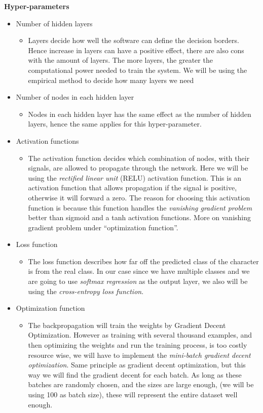 \documentclass[Report.tex]{subfiles}
\begin{document}
  \begin{flushleft}
    \textbf{Hyper-parameters}
    \begin{itemize}
     \item{Number of hidden layers}
     \begin{itemize}
      \item{Layers decide how well the software can define the decision borders. Hence increase in layers can have a positive effect, there are also cons with the amount of layers. The more layers, the greater the computational power needed to train the system. We will be using the empirical method to decide how many layers we need}
     \end{itemize}
     \item{Number of nodes in each hidden layer}
     \begin{itemize}
      \item{Nodes in each hidden layer has the same effect as the number of hidden layers, hence the same applies for this hyper-parameter.}
     \end{itemize}
     \item{Activation functions}
     \begin{itemize}
      \item{The activation function decides which combination of nodes, with their signals, are allowed to propagate through the network. Here we will be using the \textit{rectified linear unit} (RELU) activation function. This is an activation function that allows propagation if the signal is positive, otherwise it will forward a zero. The reason for choosing this activation function is because this function handles the \textit{vanishing gradient problem} better than sigmoid and a tanh activation functions. More on vanishing gradient problem under ``optimization function''.}
     \end{itemize}
     \item{Loss function}
     \begin{itemize}
      \item{The loss function describes how far off the predicted class of the character is from the real class. In our case since we have multiple classes and we are going to use \textit{softmax regression} as the output layer, we also will be using the \textit{cross-entropy loss function}.}
     \end{itemize}
     \item{Optimization function}
     \begin{itemize}
      \item{The backpropagation will train the weights by Gradient Decent Optimization. However as training with several thousand examples, and then optimizing the weights and run the training process, is too costly resource wise, we will have to implement the \textit{mini-batch gradient decent optimization}. Same principle as gradient decent optimization, but this way we will find the gradient decent for each batch. As long as these batches are randomly chosen, and the sizes are large enough, (we will be using 100 as batch size), these will represent the entire dataset well enough.}

\end{itemize}
\end{itemize}
\end{flushleft}
\end{document}
